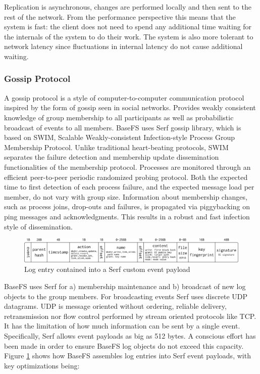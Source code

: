 \documentclass{sig-alternate}
\begin{document}
Replication is asynchronous, changes are performed locally and then sent to the rest of the network. From the performance perspective this means that the system is fast: the client does not need to spend any additional time waiting for the internals of the system to do their work. The system is also more tolerant to network latency since fluctuations in internal latency do not cause additional waiting. 



\subsubsection{Gossip Protocol}\label{gossip-protocol}

A gossip protocol is a style of computer-to-computer communication protocol inspired by the form of gossip seen in social networks. Provides weakly consistent knowledge of group membership to all participants as well as probabilistic broadcast of events to all members. BaseFS uses Serf gossip library, which is based on SWIM, Scalable Weakly-consistent Infection-style Process Group Membership Protocol\cite{SWIM}. Unlike traditional heart-beating protocols, SWIM separates the failure detection and membership update dissemination functionalities of the membership protocol. Processes are monitored through an efficient peer-to-peer periodic randomized probing protocol. Both the expected time to first detection of each process failure, and the expected message load per member, do not vary with group size. Information about membership changes, such as process joins, drop-outs and failures, is propagated via piggybacking on ping messages and acknowledgments. This results in a robust and fast infection style of dissemination. 


\begin{figure}
\centering
\includegraphics[width=\textwidth]{imgs/payload.png}
\caption{Log entry contained into a Serf custom event payload}
\label{fig:payload}
\end{figure}

BaseFS uses Serf for a) membership maintenance and b) broadcast of new log objects to the group members. For broadcasting events Serf uses discrete UDP datagrams. UDP is message oriented without ordering, reliable delivery, retransmission nor flow control performed by stream oriented protocols like TCP. It has the limitation of how much information can be sent by a single event. Specifically, Serf allows event payloads as big as 512 bytes. A conscious effort has been made in order to ensure BaseFS log objects do not exceed this capacity. Figure \ref{fig:payload} shows how BaseFS assembles log entries into Serf event payloads, with key optimizations being:
\end{document}
